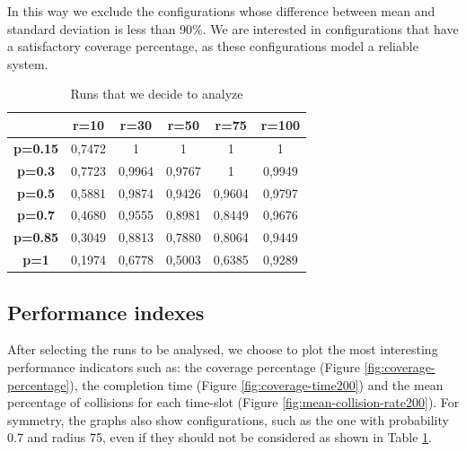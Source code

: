 In this way we exclude the configurations whose difference between mean and standard deviation is less than 90\%. We are interested in configurations that have a satisfactory coverage percentage, as these configurations model a reliable system.

\begin{table}[H]
\centering
\begin{tabular}{|c|c|c|c|c|c|}
\hline
 & \textbf{r=10} & \textbf{r=30} & \textbf{r=50} & \textbf{r=75} & \textbf{r=100} \\ \hline
\textbf{p=0.15} & 0,7472 & \cellcolor[HTML]{92D050}1 & \cellcolor[HTML]{92D050}1 & \cellcolor[HTML]{92D050}1 & \cellcolor[HTML]{92D050}1 \\ \hline
\textbf{p=0.3} & 0,7723 & \cellcolor[HTML]{92D050}0,9964 & \cellcolor[HTML]{92D050}0,9767 & \cellcolor[HTML]{92D050}1 & \cellcolor[HTML]{92D050}0,9949 \\ \hline
\textbf{p=0.5} & 0,5881 & \cellcolor[HTML]{92D050}0,9874 & \cellcolor[HTML]{92D050}0,9426 & \cellcolor[HTML]{92D050}0,9604 & \cellcolor[HTML]{92D050}0,9797 \\ \hline
\textbf{p=0.7} & 0,4680 & \cellcolor[HTML]{92D050}0,9555 & 0,8981 & 0,8449 & \cellcolor[HTML]{92D050}0,9676 \\ \hline
\textbf{p=0.85} & 0,3049 & 0,8813 & 0,7880 & 0,8064 & \cellcolor[HTML]{92D050}0,9449 \\ \hline
\textbf{p=1} & 0,1974 & 0,6778 & 0,5003 & 0,6385 & \cellcolor[HTML]{92D050}0,9289 \\ \hline
\end{tabular}
\caption{Runs that we decide to analyze}
\label{tab:run-to-analyze}
\end{table}



\subsection{Performance indexes} \label{200Index}
After selecting the runs to be analysed, we choose to plot the most interesting performance indicators such as: the coverage percentage (Figure \ref{fig:coverage-percentage}), the completion time (Figure \ref{fig:coverage-time200}) and the mean percentage of collisions for each time-slot (Figure \ref{fig:mean-collision-rate200}). For symmetry, the graphs also show configurations, such as the one with probability 0.7 and radius 75, even if they  should not be considered as shown in Table \ref{tab:run-to-analyze}.

